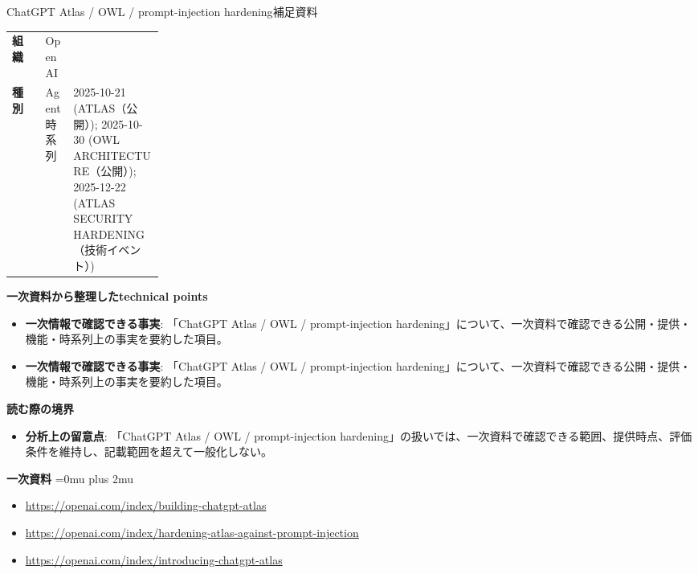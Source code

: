 \begin{technicalnote}{ChatGPT Atlas / OWL / prompt-injection hardening}{補足資料}
\begingroup
\begin{tabularx}{\linewidth}{@{}>{\bfseries}p{0.22\linewidth}X@{}}
組織 & OpenAI \\
種別 & Agent
時系列 & 2025-10-21 (ATLAS（公開）); 2025-10-30 (OWL ARCHITECTURE（公開）); 2025-12-22 (ATLAS SECURITY HARDENING（技術イベント）) \\
\end{tabularx}
\smallskip
{\bfseries 一次資料から整理したtechnical points}
\begin{itemize}[leftmargin=1.5em,itemsep=0.35em]
\item \textbf{一次情報で確認できる事実}: 「ChatGPT Atlas / OWL / prompt-injection hardening」について、一次資料で確認できる公開・提供・機能・時系列上の事実を要約した項目。
\item \textbf{一次情報で確認できる事実}: 「ChatGPT Atlas / OWL / prompt-injection hardening」について、一次資料で確認できる公開・提供・機能・時系列上の事実を要約した項目。
\end{itemize}
\begin{minipage}{\linewidth}
{\bfseries 読む際の境界}
\begin{itemize}[leftmargin=1.5em,itemsep=0.35em]
\item \textbf{分析上の留意点}: 「ChatGPT Atlas / OWL / prompt-injection hardening」の扱いでは、一次資料で確認できる範囲、提供時点、評価条件を維持し、記載範囲を超えて一般化しない。
\end{itemize}
\begin{samepage}
{\bfseries 一次資料}
\begingroup\sloppy
\Urlmuskip=0mu plus 2mu\relax
\begin{itemize}[leftmargin=1.5em,itemsep=0.25em]
\item {\scriptsize\url{https://openai.com/index/building-chatgpt-atlas}}
\item {\scriptsize\url{https://openai.com/index/hardening-atlas-against-prompt-injection}}
\item {\scriptsize\url{https://openai.com/index/introducing-chatgpt-atlas}}
\end{itemize}
\endgroup
\end{samepage}
\end{minipage}
\endgroup
\end{technicalnote}
\medskip

